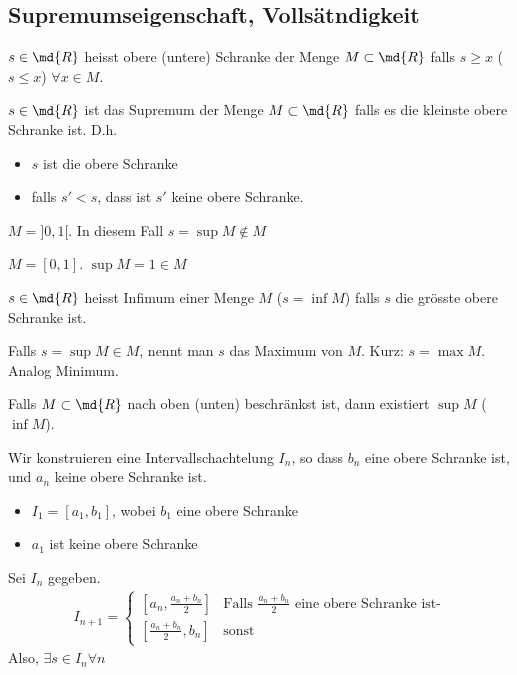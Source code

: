 \subsection{Supremumseigenschaft, Vollsätndigkeit}
\begin{Def}
  $s\in\md{R}$ heisst obere (untere) Schranke der Menge $M\subset \md{R}$ falls $s\geq x$ ($s\leq x$) $\forall x\in M$.
\end{Def}
\begin{Def}
  $s\in\md{R}$ ist das Supremum der Menge $M\subset\md{R}$ falls es die kleinste obere Schranke ist. D.h.
  \begin{itemize}
    \item $s$ ist die obere Schranke
    \item falls $s'<s$, dass ist $s'$ keine obere Schranke.
  \end{itemize}
\end{Def}
\begin{Bsp}
  $M=]0,1[$. In diesem Fall $s=\sup M\not\in M$
\end{Bsp}
\begin{Bsp}
  $M=[0,1]$. $\sup M=1\in M$
\end{Bsp}
\begin{Def}
  $s\in\md{R}$ heisst Infimum einer Menge $M$ ($s=\inf M$) falls $s$ die grösste obere Schranke ist.
\end{Def}
\begin{Def}
  Falls $s=\sup M\in M$, nennt man $s$ das Maximum von $M$. Kurz: $s=\max M$. Analog Minimum.
\end{Def}
\begin{Sat}
  Falls $M\subset \md{R}$ nach oben (unten) beschränkst ist, dann existiert $\sup M$ ($\inf M$).
\end{Sat}
\begin{Bew}
  Wir konstruieren eine Intervallschachtelung $I_n$, so dass $b_n$ eine obere Schranke ist, und $a_n$ keine obere Schranke ist.
  \begin{itemize}
    \item $I_1=[a_1, b_1]$, wobei $b_1$ eine obere Schranke
    \item $a_1$ ist keine obere Schranke
  \end{itemize}
  Sei $I_n$ gegeben. 
  \begin{align*}
    I_{n+1} = \begin{cases}
      \left[ a_n,\frac{a_n+b_n}{2} \right]&\text{Falls $\frac{a_n+b_n}{2}$ eine obere Schranke ist-}\\
      \left[ \frac{a_n+b_n}{2}, b_n \right]&\text{sonst}
    \end{cases}
  \end{align*}
  Also, $\exists s\in I_n\forall n$
\end{Bew}
